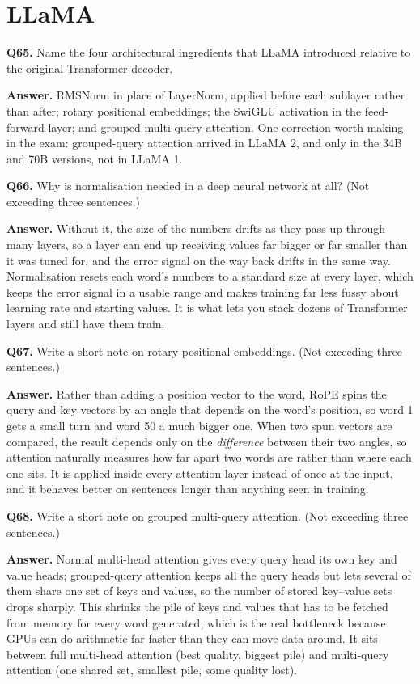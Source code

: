 \documentclass[11pt]{article}
\begin{document}
\section{LLaMA}

\textbf{Q65.} Name the four architectural ingredients that LLaMA introduced relative to the
original Transformer decoder.

\textbf{Answer.} RMSNorm in place of LayerNorm, applied before each sublayer rather than
after; rotary positional embeddings; the SwiGLU activation in the feed-forward layer; and
grouped multi-query attention. One correction worth making in the exam: grouped-query
attention arrived in LLaMA 2, and only in the 34B and 70B versions, not in LLaMA 1.

\medskip
\textbf{Q66.} Why is normalisation needed in a deep neural network at all? (Not exceeding three
sentences.)

\textbf{Answer.} Without it, the size of the numbers drifts as they pass up through many
layers, so a layer can end up receiving values far bigger or far smaller than it was tuned
for, and the error signal on the way back drifts in the same way. Normalisation resets each
word's numbers to a standard size at every layer, which keeps the error signal in a usable
range and makes training far less fussy about learning rate and starting values. It is what
lets you stack dozens of Transformer layers and still have them train.

\medskip
\textbf{Q67.} Write a short note on rotary positional embeddings. (Not exceeding three
sentences.)

\textbf{Answer.} Rather than adding a position vector to the word, RoPE spins the query and
key vectors by an angle that depends on the word's position, so word 1 gets a small turn and
word 50 a much bigger one. When two spun vectors are compared, the result depends only on the
\emph{difference} between their two angles, so attention naturally measures how far apart two
words are rather than where each one sits. It is applied inside every attention layer instead
of once at the input, and it behaves better on sentences longer than anything seen in
training.

\medskip
\textbf{Q68.} Write a short note on grouped multi-query attention. (Not exceeding three
sentences.)

\textbf{Answer.} Normal multi-head attention gives every query head its own key and value
heads; grouped-query attention keeps all the query heads but lets several of them share one
set of keys and values, so the number of stored key--value sets drops sharply. This shrinks
the pile of keys and values that has to be fetched from memory for every word generated, which
is the real bottleneck because GPUs can do arithmetic far faster than they can move data
around. It sits between full multi-head attention (best quality, biggest pile) and
multi-query attention (one shared set, smallest pile, some quality lost).
\end{document}
